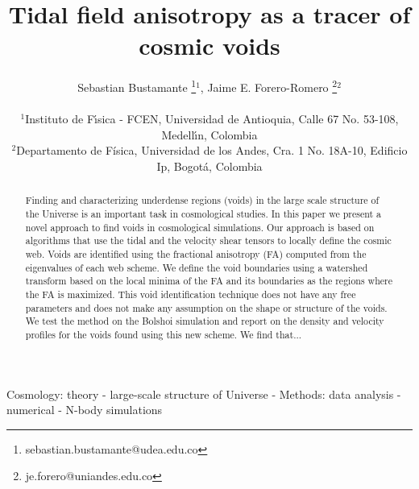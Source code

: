 \documentclass[a4,useAMS,usenatbib,usegraphicx]{mn2e}
\begin{document}
\title{Tidal field anisotropy as a tracer of cosmic voids}
\author[S. Bustamante and J.E. Forero-Romero]{
\parbox[t]{\textwidth}{\raggedright 
  Sebastian Bustamante \thanks{sebastian.bustamante@udea.edu.co}$^{1}$,
  Jaime E. Forero-Romero \thanks{je.forero@uniandes.edu.co}$^{2}$ 
}
\vspace*{6pt}\\
$^1$Instituto de F\'{\i}sica - FCEN, Universidad de Antioquia, Calle
67 No. 53-108, Medell\'{\i}n, Colombia\\ 
$^2$Departamento de F\'{i}sica, Universidad de los Andes, Cra. 1
No. 18A-10, Edificio Ip, Bogot\'a, Colombia
}

\maketitle

\begin{abstract}
Finding and characterizing underdense regions (voids) in the large
scale structure of the Universe is an important task in cosmological
studies.  
In this paper we present a novel approach to find voids in
cosmological simulations.  
Our approach is based on algorithms that use the tidal and the
velocity shear tensors to locally define the cosmic web.
Voids are identified using the fractional anisotropy (FA) computed
from the eigenvalues of each web scheme. 
We define the void boundaries using a watershed transform based on the
local minima of the FA and its boundaries as the regions where the FA
is maximized.
This void identification technique does not have any free parameters
and does not make any assumption on the shape or structure of the
voids.  
We test the method on the Bolshoi simulation and report on the density
and velocity profiles for the voids found using this new scheme. 
We find that...
\end{abstract}

\begin{keywords}
Cosmology: theory - large-scale structure of Universe -
Methods: data analysis - numerical - N-body simulations
\end{keywords}


\end{document}
